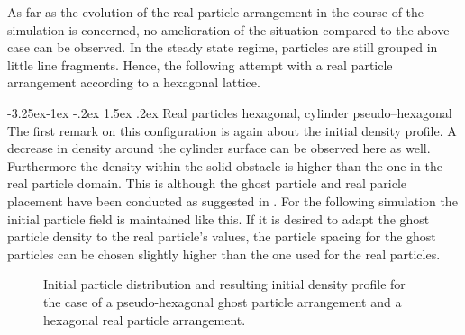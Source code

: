 \documentclass{report}
\makeatletter
\renewcommand\paragraph{\@startsection{paragraph}{4}{\z@}%
  {-3.25ex\@plus -1ex \@minus -.2ex}%
  {1.5ex \@plus .2ex}%
  {\normalfont\normalsize\bfseries}}
\makeatother
\begin{document}
As far as the evolution of the real particle arrangement in the course of the simulation is concerned, no amelioration of the situation compared to the above case can be observed. In the steady state regime, particles are still grouped in little line fragments. Hence, the following attempt with a real particle arrangement according to a hexagonal lattice.


\paragraph{Real particles hexagonal, cylinder pseudo--hexagonal}
The first remark on this configuration is again about the initial density profile. A decrease in density around the cylinder surface can be observed here as well. Furthermore the density within the solid obstacle is higher than the one in the real particle domain. This is although the ghost particle and real paricle  placement have been conducted as suggested in \cite{Zhu1999}. %
For the following simulation the initial particle field is maintained like this. If it is desired to adapt the ghost particle density to the real particle's values, the particle spacing for the ghost particles can be chosen slightly higher than the one used for the real particles.

\begin{figure}[h]
\centering
\label{fig:PorosResultsCylinder_prtlDiscontinuity_Hex_pseudoHex}

\caption[Initial situation for cylinder porosities]{Initial particle distribution   and resulting initial density profile  for the case of a pseudo-hexagonal ghost particle arrangement and a hexagonal real particle arrangement.}	
\end{figure}
\end{document}
